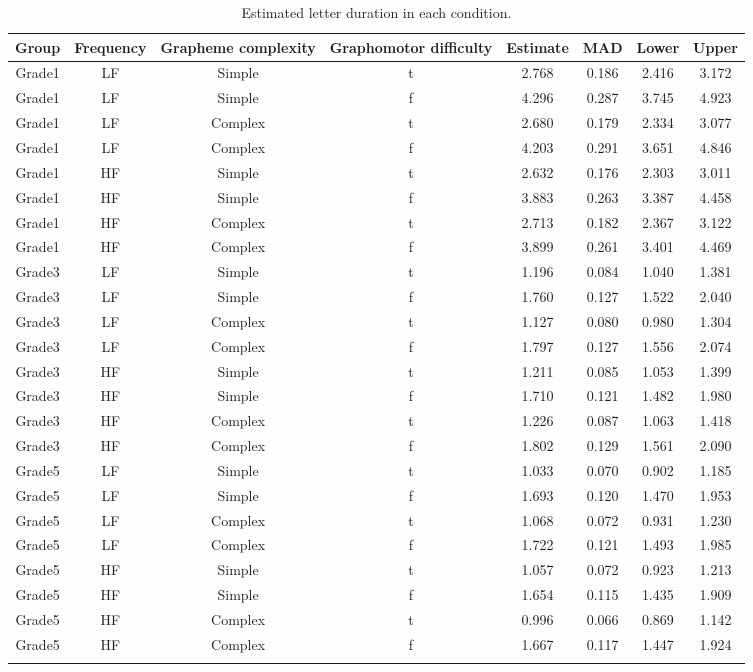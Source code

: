 \documentclass[
  11pt,
  english,
  ,doc,floatsintext]{apa6}
\begin{document}
\begin{table}[htb]

\begin{center}
\begin{threeparttable}

\caption{\label{tab:duration-predictions-summary}Estimated letter duration in each condition.}

\scriptsize{

\begin{tabular}{cccccccc}
\toprule
Group & \multicolumn{1}{c}{Frequency} & \multicolumn{1}{c}{Grapheme complexity} & \multicolumn{1}{c}{Graphomotor difficulty} & \multicolumn{1}{c}{Estimate} & \multicolumn{1}{c}{MAD} & \multicolumn{1}{c}{Lower} & \multicolumn{1}{c}{Upper}\\
\midrule
Grade1 & LF & Simple & t & 2.768 & 0.186 & 2.416 & 3.172\\
Grade1 & LF & Simple & f & 4.296 & 0.287 & 3.745 & 4.923\\
Grade1 & LF & Complex & t & 2.680 & 0.179 & 2.334 & 3.077\\
Grade1 & LF & Complex & f & 4.203 & 0.291 & 3.651 & 4.846\\
Grade1 & HF & Simple & t & 2.632 & 0.176 & 2.303 & 3.011\\
Grade1 & HF & Simple & f & 3.883 & 0.263 & 3.387 & 4.458\\
Grade1 & HF & Complex & t & 2.713 & 0.182 & 2.367 & 3.122\\
Grade1 & HF & Complex & f & 3.899 & 0.261 & 3.401 & 4.469\\
Grade3 & LF & Simple & t & 1.196 & 0.084 & 1.040 & 1.381\\
Grade3 & LF & Simple & f & 1.760 & 0.127 & 1.522 & 2.040\\
Grade3 & LF & Complex & t & 1.127 & 0.080 & 0.980 & 1.304\\
Grade3 & LF & Complex & f & 1.797 & 0.127 & 1.556 & 2.074\\
Grade3 & HF & Simple & t & 1.211 & 0.085 & 1.053 & 1.399\\
Grade3 & HF & Simple & f & 1.710 & 0.121 & 1.482 & 1.980\\
Grade3 & HF & Complex & t & 1.226 & 0.087 & 1.063 & 1.418\\
Grade3 & HF & Complex & f & 1.802 & 0.129 & 1.561 & 2.090\\
Grade5 & LF & Simple & t & 1.033 & 0.070 & 0.902 & 1.185\\
Grade5 & LF & Simple & f & 1.693 & 0.120 & 1.470 & 1.953\\
Grade5 & LF & Complex & t & 1.068 & 0.072 & 0.931 & 1.230\\
Grade5 & LF & Complex & f & 1.722 & 0.121 & 1.493 & 1.985\\
Grade5 & HF & Simple & t & 1.057 & 0.072 & 0.923 & 1.213\\
Grade5 & HF & Simple & f & 1.654 & 0.115 & 1.435 & 1.909\\
Grade5 & HF & Complex & t & 0.996 & 0.066 & 0.869 & 1.142\\
Grade5 & HF & Complex & f & 1.667 & 0.117 & 1.447 & 1.924\\
\bottomrule
\addlinespace
\end{tabular}

}
\end{threeparttable}
\end{center}
\end{table}
\end{document}
